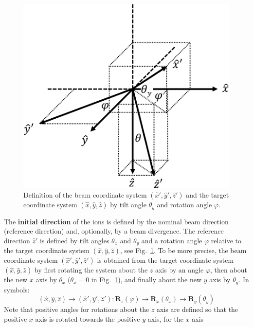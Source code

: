 \begin{figure}[htbp]
\centering
\noindent\includegraphics[scale=1.0]{coordinate_systems-crop.pdf}
\caption{Definition of the beam coordinate system $(\hat{x}', \hat{y}',
\hat{z}')$ and the target coordinate system $(\hat{x}, \hat{y}, \hat{z})$ by
tilt angle $\theta_y$ and rotation angle $\varphi$.}
\label{fig:coord}
\end{figure}   
%
The \textbf{initial direction} of the ions is defined by the nominal beam
direction (reference direction) and, optionally, by a beam 
divergence. The reference direction $\hat{z}'$ is defined by tilt angles 
$\theta_x$ and $\theta_y$ and a rotation angle $\varphi$ relative to the target 
coordinate system $(\hat{x}, \hat{y}, \hat{z})$, see Fig.~\ref{fig:coord}. To 
be more precise, the beam coordinate system $(\hat{x}', \hat{y}', \hat{z}')$ 
is obtained from the target coordinate system $(\hat{x}, \hat{y}, \hat{z})$ by 
first rotating the system about the $z$ axis by an angle $\varphi$, then
about the new $x$ axis by $\theta_x$ ($\theta_x=0$ in Fig.~\ref{fig:coord}), and 
finally about the new $y$ axis by $\theta_y$. In symbols:
%
\begin{equation}
    (\hat{x}, \hat{y}, \hat{z}) \rightarrow (\hat{x}', \hat{y}', \hat{z}'): 
        \mathbf{R}_z(\varphi) 
        \rightarrow \mathbf{R}_x(\theta_x)
        \rightarrow \mathbf{R}_y(\theta_y)
\end{equation}
%
Note that positive angles for rotations about the $z$ axis are defined so that
the positive $x$ axis is rotated towards the positive $y$ axis, for the $x$ axis
